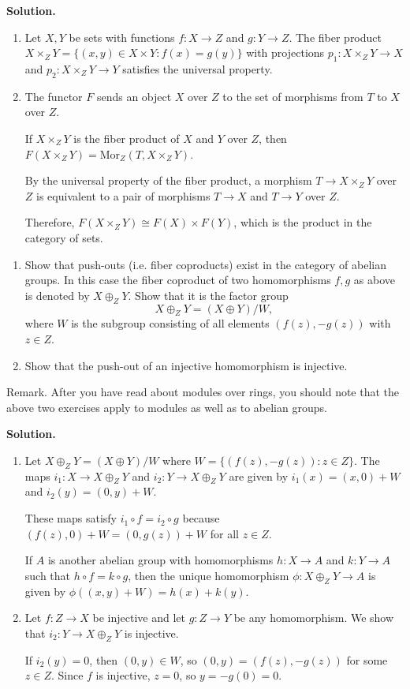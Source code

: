 \noindent\textbf{Solution.}
\begin{enumerate}[label=(\alph*)]
\item Let $X, Y$ be sets with functions $f: X \to Z$ and $g: Y \to Z$. The fiber product $X \times_Z Y = \{(x, y) \in X \times Y : f(x) = g(y)\}$ with projections $p_1: X \times_Z Y \to X$ and $p_2: X \times_Z Y \to Y$ satisfies the universal property.

\item The functor $F$ sends an object $X$ over $Z$ to the set of morphisms from $T$ to $X$ over $Z$.

If $X \times_Z Y$ is the fiber product of $X$ and $Y$ over $Z$, then $F(X \times_Z Y) = \text{Mor}_Z(T, X \times_Z Y)$.

By the universal property of the fiber product, a morphism $T \to X \times_Z Y$ over $Z$ is equivalent to a pair of morphisms $T \to X$ and $T \to Y$ over $Z$.

Therefore, $F(X \times_Z Y) \cong F(X) \times F(Y)$, which is the product in the category of sets.
\end{enumerate}

\begin{problembox}
\begin{enumerate}[label=(\alph*)]
\item Show that push-outs (i.e. fiber coproducts) exist in the category of abelian groups. In this case the fiber coproduct of two homomorphisms $f, g$ as above is denoted by $X \oplus_Z Y$. Show that it is the factor group
\[X \oplus_Z Y = (X \oplus Y)/W,\]
where $W$ is the subgroup consisting of all elements $(f(z), -g(z))$ with $z \in Z$.
\item Show that the push-out of an injective homomorphism is injective.
\end{enumerate}
Remark. After you have read about modules over rings, you should note that the above two exercises apply to modules as well as to abelian groups.
\end{problembox}

\noindent\textbf{Solution.}
\begin{enumerate}[label=(\alph*)]
\item Let $X \oplus_Z Y = (X \oplus Y)/W$ where $W = \{(f(z), -g(z)) : z \in Z\}$. The maps $i_1: X \to X \oplus_Z Y$ and $i_2: Y \to X \oplus_Z Y$ are given by $i_1(x) = (x, 0) + W$ and $i_2(y) = (0, y) + W$.

These maps satisfy $i_1 \circ f = i_2 \circ g$ because $(f(z), 0) + W = (0, g(z)) + W$ for all $z \in Z$.

If $A$ is another abelian group with homomorphisms $h: X \to A$ and $k: Y \to A$ such that $h \circ f = k \circ g$, then the unique homomorphism $\phi: X \oplus_Z Y \to A$ is given by $\phi((x, y) + W) = h(x) + k(y)$.

\item Let $f: Z \to X$ be injective and let $g: Z \to Y$ be any homomorphism. We show that $i_2: Y \to X \oplus_Z Y$ is injective.

If $i_2(y) = 0$, then $(0, y) \in W$, so $(0, y) = (f(z), -g(z))$ for some $z \in Z$. Since $f$ is injective, $z = 0$, so $y = -g(0) = 0$.
\end{enumerate}

